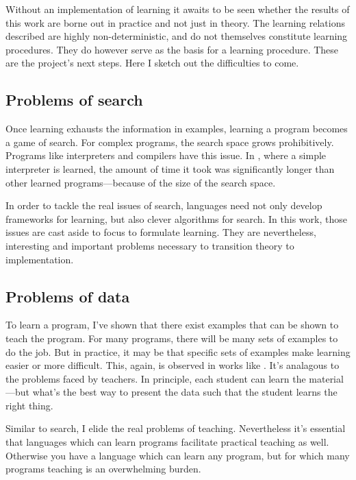 Without an implementation of learning it awaits to be seen whether the results of this work are borne out in practice and not just in theory. The learning relations described are highly non-deterministic, and do not themselves constitute learning procedures. They do however serve as the basis for a learning procedure. These are the project's next steps. Here I sketch out the difficulties to come.

\subsection{Problems of search}

Once learning exhausts the information in examples, learning a program becomes a game of search. For complex programs, the search space grows prohibitively. Programs like interpreters and compilers have this issue. In \cite{osera2015program}, where a simple interpreter is learned, the amount of time it took was significantly longer than other learned programs---because of the size of the search space.

In order to tackle the real issues of search, languages need not only develop frameworks for learning, but also clever algorithms for search. In this work, those issues are cast aside to focus to formulate learning. They are nevertheless, interesting and important problems necessary to transition theory to implementation.

\subsection{Problems of data}

To learn a program, I've shown that there exist examples that can be shown to teach the program. For many programs, there will be many sets of examples to do the job. But in practice, it may be that specific sets of examples make learning easier or more difficult. This, again, is observed in works like \cite{osera2015program}. It's analagous to the problems faced by teachers. In principle, each student can learn the material---but what's the best way to present the data such that the student learns the right thing.

Similar to search, I elide the real problems of teaching. Nevertheless it's essential that languages which can learn programs facilitate practical teaching as well. Otherwise you have a language which can learn any program, but for which many programs teaching is an overwhelming burden.



